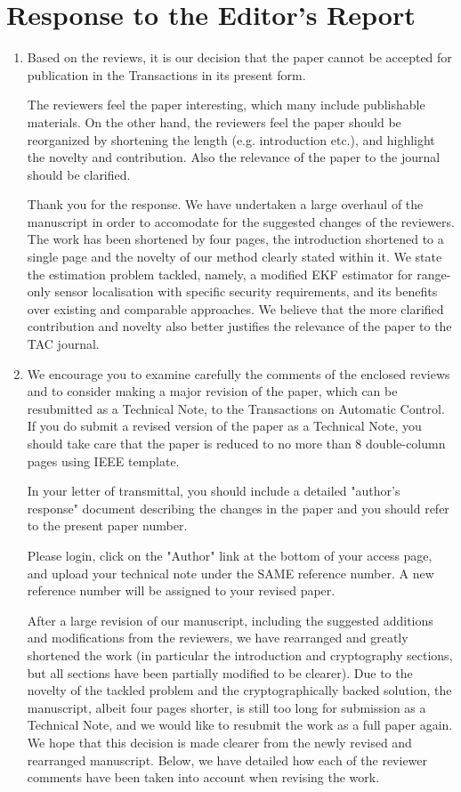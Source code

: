 \documentclass[a4paper]{scrartcl}
\newenvironment{rebuttal}{\begin{enumerate}[label={\color{grey}\thesection.\arabic{enumi}},leftmargin=0pt,ref=\thesection.\arabic{enumi}]}{\end{enumerate}}
\newcommand{\reviewtext}[1]{{\color{nblue} #1}}
\begin{document}
\section*{Response to the Editor's Report}
\def\thesection{E}
\begin{rebuttal} %
\item \reviewtext{Based on the reviews, it is our decision that the paper cannot be accepted for publication in the Transactions in its present form.

The reviewers feel the paper interesting, which many include publishable materials. On the other hand, the reviewers feel the paper should be reorganized by shortening the length (e.g. introduction etc.), and highlight the novelty and contribution. Also the relevance of the paper to the journal should be clarified.}

Thank you for the response. We have undertaken a large overhaul of the manuscript in order to accomodate for the suggested changes of the reviewers. The work has been shortened by four pages, the introduction shortened to a single page and the novelty of our method clearly stated within it. We state the estimation problem tackled, namely, a modified EKF estimator for range-only sensor localisation with specific security requirements, and its benefits over existing and comparable approaches. We believe that the more clarified contribution and novelty also better justifies the relevance of the paper to the TAC journal.

\item \reviewtext{We encourage you to examine carefully the comments of the enclosed reviews and to consider making a major revision of the paper, which can be resubmitted as a Technical Note, to the Transactions on Automatic Control.  If you do submit a revised version of the paper as a Technical Note, you should take care that the paper is reduced to no
more than 8 double-column pages using IEEE template.

In your letter of transmittal, you should include a detailed "author's response" document describing the changes in the paper and you should refer to the present paper number.

Please login, click on the "Author" link at the bottom of your access page, and upload your technical note under the SAME reference number. A new reference number will be assigned to your revised paper.}

After a large revision of our manuscript, including the suggested additions and modifications from the reviewers, we have rearranged and greatly shortened the work (in particular the introduction and cryptography sections, but all sections have been partially modified to be clearer). Due to the novelty of the tackled problem and the cryptographically backed solution, the manuscript, albeit four pages shorter, is still too long for submission as a Technical Note, and we would like to resubmit the work as a full paper again. We hope that this decision is made clearer from the newly revised and rearranged manuscript. Below, we have detailed how each of the reviewer comments have been taken into account when revising the work.

\end{rebuttal}
\end{document}
